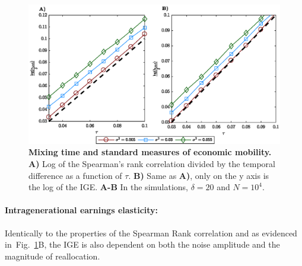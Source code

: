 \documentclass[11pt]{article}
\newcommand{\ie}{{\it i.e.}\xspace}
\newcommand{\fref}[1]{Fig.~\ref{fig:#1}}
\numberwithin{equation}{section}
\begin{document}
\begin{figure}[!htb]
\centering
\includegraphics[width=1.0\textwidth]{figs/fig_rgbm_standard_measures.eps}
\caption{\textbf{Mixing time and standard measures of economic mobility.} \textbf{A)} Log of the Spearman's rank correlation divided by the temporal difference as a function of $\tau$. \textbf{B)} Same as \textbf{A)}, only on the y axis is the log of the IGE. %
\textbf{A-B} In the simulations, $\delta = 20$ and $N = 10^4$.
\label{fig:rgbm-standard-measures}}
\end{figure}
\FloatBarrier

\paragraph{Intragenerational earnings elasticity:} 
Identically to the properties of the Spearman Rank correlation and as evidenced in~\fref{rgbm-standard-measures}B, the IGE is also dependent on both the noise amplitude and the magnitude of reallocation.
\end{document}
